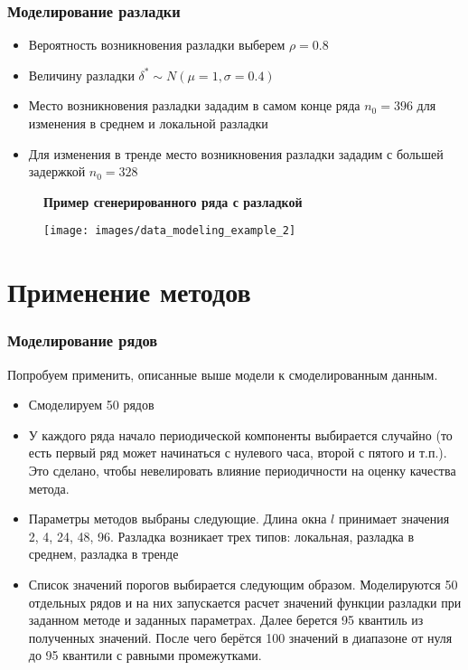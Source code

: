 \documentclass[intlimits, 9pt, unicode]{beamer}
\begin{document}
\begin{frame}
\frametitle{Моделирование разладки}

\begin{itemize}
	\item Вероятность возникновения разладки выберем $\rho = 0.8$
	\item Величину разладки $\delta^* \sim N(\mu = 1,\sigma = 0.4)$
	\item Место возникновения разладки зададим в самом конце ряда $n_0 = 396$ для изменения в среднем и локальной разладки
	\item Для изменения в тренде место возникновения разладки зададим с большей задержкой $n_0 = 328$
\end{itemize}

\begin{figure}
\textbf{Пример сгенерированного ряда с разладкой}\par\medskip
\texttt{[image: images/data\_modeling\_example\_2]}
\end{figure}
\end{frame}


\section{Применение методов}

\begin{frame}
\frametitle{Моделирование рядов}

Попробуем применить, описанные выше модели к смоделированным данным.
\begin{itemize}
	\item Смоделируем 50 рядов
	\item У каждого ряда начало периодической компоненты выбирается случайно (то есть первый ряд может начинаться с нулевого часа, второй с пятого и т.п.). Это сделано, чтобы невелировать влияние периодичности на оценку качества метода.
	\item Параметры методов выбраны следующие. Длина окна $l$ принимает значения 2, 4, 24, 48, 96. Разладка возникает трех типов: локальная, разладка в среднем, разладка в тренде
	\item Список значений порогов выбирается следующим образом. Моделируются 50 отдельных рядов и на них запускается расчет значений функции разладки при заданном методе и заданных параметрах. Далее берется 95 квантиль из полученных значений. После чего берётся 100 значений в диапазоне от нуля до 95 квантили с равными промежутками.
\end{itemize}

\end{frame}
\end{document}
